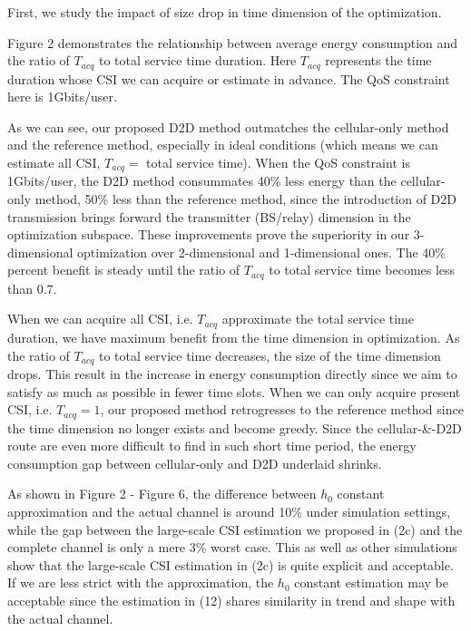 \documentclass{ieeeaccess}
\begin{document}

First, we study the impact of size drop in time dimension of the optimization. 

Figure 2 demonstrates the relationship between average energy consumption and the ratio of ${T_{acq}}$ to total service time duration. Here ${T_{acq}}$ represents the time duration whose CSI we can acquire or estimate in advance. The QoS constraint here is 1Gbits/user. 

As we can see, our proposed D2D method outmatches the cellular-only method and the reference method, especially in ideal conditions (which means we can estimate all CSI, ${T_{acq}}=$ total service time). When the QoS constraint is 1Gbits/user, the D2D method consummates 40\% less energy than the cellular-only method, 50\% less than the reference method, since the introduction of D2D transmission brings forward the transmitter (BS/relay) dimension in the optimization subspace. These improvements prove the superiority in our 3-dimensional optimization over 2-dimensional and 1-dimensional ones. The 40\% percent benefit is steady until the ratio of ${T_{acq}}$ to total service time becomes less than 0.7. 

When we can acquire all CSI, i.e. ${T_{acq}}$ approximate the total service time duration, we have maximum benefit from the time dimension in optimization. As the ratio of ${T_{acq}}$ to total service time decreases, the size of the time dimension drops. This result in the increase in energy consumption directly since we aim to satisfy as much as possible in fewer time slots. When we can only acquire present CSI, i.e. ${T_{acq}} = 1$, our proposed method retrogresses to the reference method since the time dimension no longer exists and become greedy. Since the cellular-\&-D2D route are even more difficult to find in such short time period, the energy consumption gap between cellular-only and D2D underlaid shrinks.  

As shown in Figure 2 - Figure 6, the difference between ${h_0}$ constant approximation and the actual channel is around 10\% under simulation settings, while the gap between the large-scale CSI estimation we proposed in (2c) and the complete channel is only a mere 3\% worst case. This as well as other simulations show that the large-scale CSI estimation in (2c) is quite explicit and acceptable. If we are less strict with the approximation, the ${h_0}$ constant estimation may be acceptable since the estimation in (12) shares similarity in trend and shape with the actual channel. 
\end{document}

